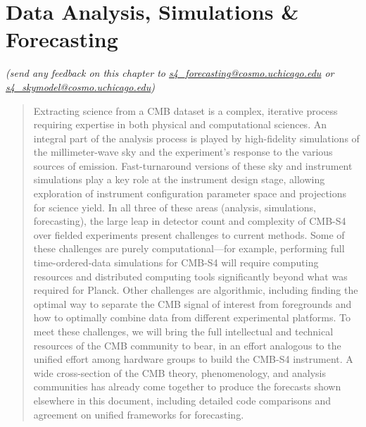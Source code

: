  
\chapter{Data Analysis, Simulations \& Forecasting}


\begin{center}
{\it \small (send any feedback on this chapter to 
\href{mailto:s4_forecasting@cosmo.uchicago.edu}{s4\_forecasting@cosmo.uchicago.edu}
or
\href{mailto:s4_skymodel@cosmo.uchicago.edu}{s4\_skymodel@cosmo.uchicago.edu})}
\end{center}

\begin{quotation}
Extracting science from a CMB dataset is a complex, iterative process requiring expertise in both physical and computational sciences. An integral part of the analysis process is played by high-fidelity simulations of the millimeter-wave sky and the experiment's response to the various sources of emission. Fast-turnaround versions of these sky and instrument simulations play a key role at the instrument design stage, allowing exploration of instrument configuration parameter space and projections for science yield. In all three of these areas (analysis, simulations, forecasting), the large leap in detector count and complexity of CMB-S4 over fielded experiments present challenges to current methods. Some of these challenges are purely computational---for example, performing full time-ordered-data simulations for CMB-S4 will require computing resources and distributed computing tools significantly beyond what was required for Planck. Other challenges are algorithmic, including finding the optimal way to separate the CMB signal of interest from foregrounds and how to optimally combine data from different experimental platforms. To meet these challenges, we will bring the full intellectual and technical resources of the CMB community to bear, in an effort analogous to the unified effort among hardware groups to build the CMB-S4 instrument. A wide cross-section of the CMB theory, phenomenology, and analysis communities has already come together to produce the forecasts shown elsewhere in this document, including detailed code comparisons and agreement on unified frameworks for forecasting.
\end{quotation}

